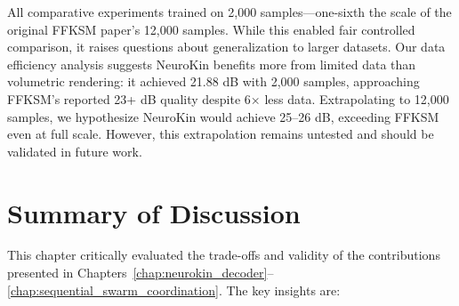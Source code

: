 \documentclass[12pt,a4paper,oneside]{report}
\begin{document}
All comparative experiments trained on 2,000 samples—one-sixth the scale of the original FFKSM paper's 12,000 samples. While this enabled fair controlled comparison, it raises questions about generalization to larger datasets. Our data efficiency analysis suggests NeuroKin benefits more from limited data than volumetric rendering: it achieved 21.88 dB with 2,000 samples, approaching FFKSM's reported 23+ dB quality despite 6× less data. Extrapolating to 12,000 samples, we hypothesize NeuroKin would achieve 25–26 dB, exceeding FFKSM even at full scale. However, this extrapolation remains untested and should be validated in future work.

\section{Summary of Discussion}

This chapter critically evaluated the trade-offs and validity of the contributions presented in Chapters~\ref{chap:neurokin_decoder}--\ref{chap:sequential_swarm_coordination}. The key insights are:
\end{document}
